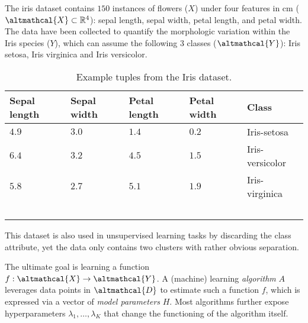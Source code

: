 \documentclass[a4paper,12pt,times,numbered,print,index]{Classes/PhDThesisPSnPDF}
\begin{document}
\begin{example}\label{ex:dataset}
    The iris dataset contains $150$ instances of flowers ($X$) under four features in cm ($\altmathcal{X} \subset \mathbb{R}^4$): sepal length, sepal width, petal length, and petal width.
    The data have been collected to quantify the morphologic variation within the Iris species ($Y$), which can assume the following $3$ classes ($\altmathcal{Y}$): Iris setosa, Iris virginica and Iris versicolor.
    \begin{table}[!h]
        \centering
        \begin{tabular}{llll|l}
            \hline
            Sepal length & Sepal width & Petal length & Petal width & Class \\ \hline
            $4.9$ & $3.0$ & $1.4$ & $0.2$ & Iris-setosa \\
            $6.4$ & $3.2$ & $4.5$ & $1.5$ & Iris-versicolor \\
            $5.8$ & $2.7$ & $5.1$ & $1.9$ & Iris-virginica \\ \hline
            \
        \end{tabular}
        \caption{Example tuples from the Iris dataset.}
        \label{tbl:iris}
    \end{table}

    \noindent This dataset is also used in unsupervised learning tasks by discarding the class attribute, yet the data only contains two clusters with rather obvious separation.
\end{example}

The ultimate goal is learning a function $f: \altmathcal{X} \rightarrow \altmathcal{Y}$.
A (machine) learning \textit{algorithm} $A$ leverages data points in $\altmathcal{D}$ to estimate such a function $f$, which is expressed via a vector of \textit{model parameters} $H$.
Most algorithms further expose hyperparameters $\lambda_1, \dots, \lambda_K$ that change the functioning of the algorithm itself.
\end{document}
